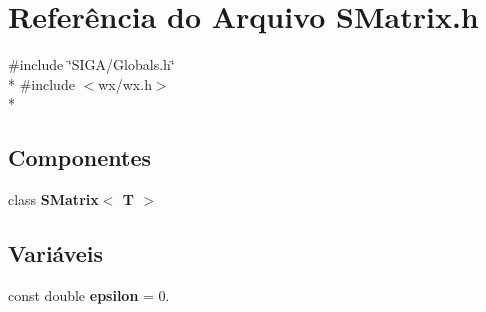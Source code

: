 \section{Referência do Arquivo S\+Matrix.\+h}
\label{_s_matrix_8h}
{\ttfamily \#include \char`\"{}S\+I\+G\+A/\+Globals.\+h\char`\"{}}\\*
{\ttfamily \#include $<$wx/wx.\+h$>$}\\*
\subsection*{Componentes}
\begin{DoxyCompactItemize}
\item 
class {\bf S\+Matrix$<$ T $>$}
\end{DoxyCompactItemize}
\subsection*{Variáveis}
\begin{DoxyCompactItemize}
\item 
const double {\bf epsilon} = 0.
\end{DoxyCompactItemize}
